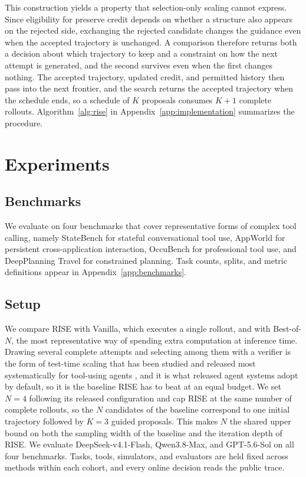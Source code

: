 \documentclass{article}
\newcommand{\method}{RISE\xspace}
\begin{document}
This construction yields a property that selection-only scaling cannot express. Since eligibility for preserve credit depends on whether a structure also appears on the rejected side, exchanging the rejected candidate changes the guidance even when the accepted trajectory is unchanged. A comparison therefore returns both a decision about which trajectory to keep and a constraint on how the next attempt is generated, and the second survives even when the first changes nothing. The accepted trajectory, updated credit, and permitted history then pass into the next frontier, and the search returns the accepted trajectory when the schedule ends, so a schedule of $K$ proposals consumes $K+1$ complete rollouts. Algorithm~\ref{alg:rise} in Appendix~\ref{app:implementation} summarizes the procedure.

\section{Experiments}

\subsection{Benchmarks}
We evaluate on four benchmarks that cover representative forms of complex tool calling, namely StateBench for stateful conversational tool use, AppWorld \citep{trivedi2024appworld} for persistent cross-application interaction, OccuBench for professional tool use, and DeepPlanning Travel for constrained planning. Task counts, splits, and metric definitions appear in Appendix~\ref{app:benchmarks}.

\subsection{Setup}
We compare \method with Vanilla, which executes a single rollout, and with \mbox{Best-of-$N$}, the most representative way of spending extra computation at inference time. Drawing several complete attempts and selecting among them with a verifier is the form of test-time scaling that has been studied and released most systematically for tool-using agents \citep{snell2025scaling,oagents2025,oppo_tts2025}, and it is what released agent systems adopt by default, so it is the baseline \method has to beat at an equal budget. We set $N=4$ following its released configuration and cap \method at the same number of complete rollouts, so the $N$ candidates of the baseline correspond to one initial trajectory followed by $K=3$ guided proposals. This makes $N$ the shared upper bound on both the sampling width of the baseline and the iteration depth of \method. We evaluate DeepSeek-v4.1-Flash, Qwen3.8-Max, and GPT-5.6-Sol on all four benchmarks. Tasks, tools, simulators, and evaluators are held fixed across methods within each cohort, and every online decision reads the public trace.
\end{document}
